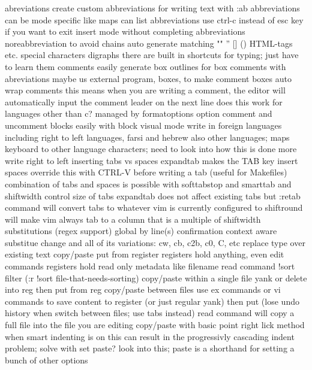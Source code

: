 \documentclass[12pt]{book}
\begin{document}
      abreviations
        create custom abbreviations for writing text with :ab
        abbreviations can be mode specific like maps
        can list abbreviations
        use ctrl-c instead of esc key if you want to exit insert mode without completing abbreviations
        noreabbreviation to avoid chains
      auto generate matching "" '' [] {} () HTML-tags etc.
    special characters
      digraphs
        there are built in shortcuts for typing; just have to learn them
    comments
      easily generate box outlines for box comments with abreviations
      maybe us external program, boxes, to make comment boxes
      auto wrap comments
        this means when you are writing a comment, the editor will automatically input the comment leader on the next line
        does this work for languages other than c?
        managed by formatoptions option
      comment and uncomment blocks easily with block visual mode
    write in foreign languages including right to left languages, farsi and hebrew
      also other languages; maps keyboard to other language characters; need to look into how this is done more
      write right to left
  inserting tabs vs spaces
    expandtab makes the TAB key insert spaces
    override this with CTRL-V before writing a tab (useful for Makefiles)
    combination of tabs and spaces is possible with softtabstop and smarttab and shiftwidth
    control size of tabs
    expandtab does not affect existing tabs but :retab command will convert tabs to whatever vim is currently configured to
    shiftround will make vim always tab to a column that is a multiple of shiftwidth
  substitutions (regex support)
    global
    by line(s)
    confirmation
    context aware substitue
    change and all of its variations: cw, cb, c2b, c0, C, etc
    replace
      type over existing text
  copy/paste
    put from register
      registers hold anything, even edit commands
      registers hold read only metadata like filename
    read command
      !sort filter (:r !sort file-that-needs-sorting)
    copy/paste within a single file
      yank or delete into reg then put from reg
    copy/paste between files
      use ex commands or vi commands to save content to register (or just regular yank) then put (lose undo history when switch between files; use tabs instead)
      read command will copy a full file into the file you are editing
    copy/paste with basic point right lick method
      when smart indenting is on this can result in the progressivly cascading indent problem;
        solve with set paste?  look into this; paste is a shorthand for setting a bunch of other options
\end{document}
